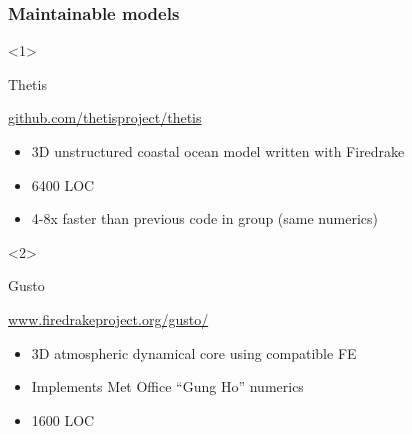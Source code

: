 \documentclass[presentation]{beamer}
\begin{document}
\begin{frame}
  \frametitle{Maintainable models}
  \begin{onlyenv}<1>
    \begin{block}{Thetis}
      \begin{center}
        \url{github.com/thetisproject/thetis}
      \end{center}
      \begin{itemize}
      \item 3D unstructured coastal ocean model written with Firedrake
      \item 6400 LOC
      \item 4-8x faster than previous code in group (same numerics)
      \end{itemize}
    \end{block}
  \end{onlyenv}
  \begin{onlyenv}<2>
    \begin{block}{Gusto}
      \begin{center}
        \url{www.firedrakeproject.org/gusto/}
      \end{center}
      \begin{itemize}
      \item 3D atmospheric dynamical core using compatible FE
      \item Implements Met Office ``Gung Ho'' numerics
      \item 1600 LOC
      \end{itemize}
    \end{block}
  \end{onlyenv}
\end{frame}
\end{document}
